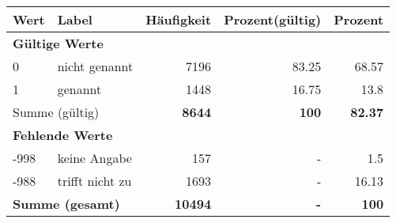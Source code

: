      \begin{longtable}{lXrrr}
     \toprule
     \textbf{Wert} & \textbf{Label} & \textbf{Häufigkeit} & \textbf{Prozent(gültig)} & \textbf{Prozent} \\
     \endhead
     \midrule
     \multicolumn{5}{l}{\textbf{Gültige Werte}}\\

     0 &
     \multicolumn{1}{X}{ nicht genannt   } &


       \num{7196} &
       \num[round-mode=places,round-precision=2]{83,25} &
         \num[round-mode=places,round-precision=2]{68,57} \\

     1 &
     \multicolumn{1}{X}{ genannt   } &


       \num{1448} &
       \num[round-mode=places,round-precision=2]{16,75} &
         \num[round-mode=places,round-precision=2]{13,8} \\
     \midrule
     \multicolumn{2}{l}{Summe (gültig)} &
       \textbf{\num{8644}} &
     \textbf{100} &
       \textbf{\num[round-mode=places,round-precision=2]{82,37}} \\
     \multicolumn{5}{l}{\textbf{Fehlende Werte}}\\
       -998 &
       keine Angabe &
         \num{157} &
        - &
         \num[round-mode=places,round-precision=2]{1,5} \\
       -988 &
       trifft nicht zu &
         \num{1693} &
        - &
         \num[round-mode=places,round-precision=2]{16,13} \\
     \midrule
     \multicolumn{2}{l}{\textbf{Summe (gesamt)}} &
          \textbf{\num{10494}} &
        \textbf{-} &
        \textbf{100} \\
     \bottomrule
     \end{longtable}
     
